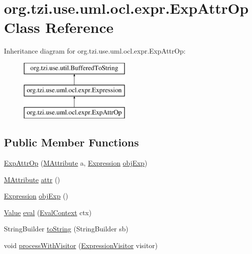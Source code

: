 \hypertarget{classorg_1_1tzi_1_1use_1_1uml_1_1ocl_1_1expr_1_1_exp_attr_op}{\section{org.\-tzi.\-use.\-uml.\-ocl.\-expr.\-Exp\-Attr\-Op Class Reference}
\label{classorg_1_1tzi_1_1use_1_1uml_1_1ocl_1_1expr_1_1_exp_attr_op}
}
Inheritance diagram for org.\-tzi.\-use.\-uml.\-ocl.\-expr.\-Exp\-Attr\-Op\-:\begin{figure}[H]
\begin{center}
\leavevmode
\includegraphics[height=3.000000cm]{classorg_1_1tzi_1_1use_1_1uml_1_1ocl_1_1expr_1_1_exp_attr_op}
\end{center}
\end{figure}
\subsection*{Public Member Functions}
\begin{DoxyCompactItemize}
\item 
\hyperlink{classorg_1_1tzi_1_1use_1_1uml_1_1ocl_1_1expr_1_1_exp_attr_op_a372f69619024b80d637ac207f53d46a2}{Exp\-Attr\-Op} (\hyperlink{classorg_1_1tzi_1_1use_1_1uml_1_1mm_1_1_m_attribute}{M\-Attribute} a, \hyperlink{classorg_1_1tzi_1_1use_1_1uml_1_1ocl_1_1expr_1_1_expression}{Expression} \hyperlink{classorg_1_1tzi_1_1use_1_1uml_1_1ocl_1_1expr_1_1_exp_attr_op_ada33c0270c3714c5c626bcc571d4ed7e}{obj\-Exp})
\item 
\hyperlink{classorg_1_1tzi_1_1use_1_1uml_1_1mm_1_1_m_attribute}{M\-Attribute} \hyperlink{classorg_1_1tzi_1_1use_1_1uml_1_1ocl_1_1expr_1_1_exp_attr_op_a686a52893629465a721ac8c6359b08f9}{attr} ()
\item 
\hyperlink{classorg_1_1tzi_1_1use_1_1uml_1_1ocl_1_1expr_1_1_expression}{Expression} \hyperlink{classorg_1_1tzi_1_1use_1_1uml_1_1ocl_1_1expr_1_1_exp_attr_op_ada33c0270c3714c5c626bcc571d4ed7e}{obj\-Exp} ()
\item 
\hyperlink{classorg_1_1tzi_1_1use_1_1uml_1_1ocl_1_1value_1_1_value}{Value} \hyperlink{classorg_1_1tzi_1_1use_1_1uml_1_1ocl_1_1expr_1_1_exp_attr_op_a61c74c698fa17781154365e6693b1d33}{eval} (\hyperlink{classorg_1_1tzi_1_1use_1_1uml_1_1ocl_1_1expr_1_1_eval_context}{Eval\-Context} ctx)
\item 
String\-Builder \hyperlink{classorg_1_1tzi_1_1use_1_1uml_1_1ocl_1_1expr_1_1_exp_attr_op_a5124e7ef4b2a56ba79f97e01efe5804c}{to\-String} (String\-Builder sb)
\item 
void \hyperlink{classorg_1_1tzi_1_1use_1_1uml_1_1ocl_1_1expr_1_1_exp_attr_op_ab7d726e1b40d87856960e57c3448241a}{process\-With\-Visitor} (\hyperlink{interfaceorg_1_1tzi_1_1use_1_1uml_1_1ocl_1_1expr_1_1_expression_visitor}{Expression\-Visitor} visitor)
\end{DoxyCompactItemize}
